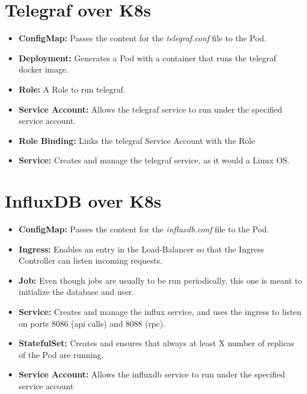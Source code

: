 \newpage
\section{Telegraf over K8s}
\begin{itemize}
  \item \textbf{ConfigMap:} Passes the content for the \textit{telegraf.conf} file to the Pod.
  \item \textbf{Deployment:} Generates a Pod with a container that runs the telegraf docker image.
  \item \textbf{Role:} A Role to run telegraf.
  \item \textbf{Service Account:} Allows the telegraf service to run under the specified service account.
  \item \textbf{Role Binding:} Links the telegraf Service Account with the Role
  \item \textbf{Service:} Creates and manage the telegraf service, as it would a Linux OS.
\end{itemize}
\section{InfluxDB over K8s}
\begin{itemize}
  \item \textbf{ConfigMap:} Passes the content for the \textit{influxdb.conf} file to the Pod.
  \item \textbf{Ingress:} Enables an entry in the Load-Balancer so that the Ingress Controller can listen incoming requests.
  \item \textbf{Job:} Even though jobs are usually to be run periodically, this one is meant to initialize the database and user.
  \item \textbf{Service:} Creates and manage the influx service, and uses the ingress to listen on ports 8086 (api calls) and 8088 (rpc).
  \item \textbf{StatefulSet:} Creates and ensures that always at least X number of replicas of the Pod are running.
  \item \textbf{Service Account:} Allows the influxdb service to run under the specified service account
\end{itemize}

